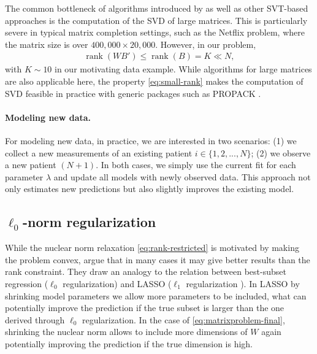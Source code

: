 \documentclass[preprint]{imsart}
\numberwithin{equation}{section}
\theoremstyle{plain}
\newcommand{\tr}[1]{{\textcolor{red}{#1}}}
\DeclareMathOperator*{\rank}{rank}
\begin{document}
The common bottleneck of algorithms introduced by \citet{cai2010singular,mazumder2010spectral,ma2011fixed} as well as other SVT-based approaches is the computation of the SVD of large matrices. This is particularly severe in typical matrix completion settings, such as the Netflix problem, where the matrix size is over $400{,}000 \times 20{,}000$. However, in our problem,
\begin{align}\label{eq:small-rank}
  \rank(WB') \leq \rank(B) = K \ll N,
\end{align}
with $K \sim 10$ in our motivating data example. While algorithms for large matrices are also applicable here, the property \eqref{eq:small-rank} makes the computation of SVD feasible in practice with generic packages such as PROPACK \citep{larsen2004propack}.

\paragraph{Modeling new data.}

For modeling new data, in practice, we are interested in two scenarios: (1) we collect a new measurements of an existing patient $i \in \{1,2,...,N\}$; (2) we observe a new patient $(N+1)$. In both cases, we simply use the current fit for each parameter $\lambda$ and update all models with newly observed data. This approach not only estimates new predictions but also slightly improves the existing model. 




\subsection{$\ell_0$-norm regularization}

While the nuclear norm relaxation \eqref{eq:rank-restricted} is motivated by making the problem convex, \citet{mazumder2010spectral} argue that in many cases it may give better results than the rank constraint. They draw an analogy to the relation between best-subset regression ($\ell_0$ regularization) and LASSO ($\ell_1$ regularization \citep{tibshirani1996regression, friedman2001elements}). In LASSO by shrinking model parameters we allow more parameters to be included, what can potentially improve the prediction if the true subset is larger than the one derived through $\ell_0$ regularization. In the case of \eqref{eq:matrixproblem-final}, shrinking the nuclear norm allows to include more dimensions of $W$ again potentially improving the prediction if the true dimension is high.
\end{document}
